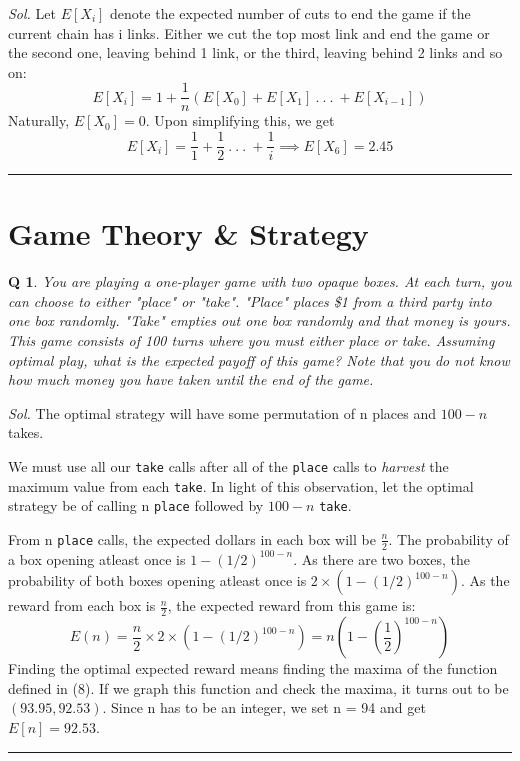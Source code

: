 \documentclass[DIV=15, fleqn, oneside, 8pt]{scrartcl}
\theoremstyle{clean}
\newtheorem{question}{Q} %
\newenvironment{solution}
{\par\textit{Sol.} }     %
{\par\medskip\hrule\bigskip}
\begin{document}
\begin{solution}
Let $E[X_i]$ denote the expected number of cuts to end the game if the current chain has i links.
Either we cut the top most link and end the game or the second one, leaving behind 1 link, or
the third, leaving behind 2 links and so on:
\[
E[X_i] = 1 + \frac{1}{n}(E[X_0] + E[X_1]\:.\:.\:.\:+E[X_{i - 1}])
\]
Naturally, $E[X_0] = 0$. Upon simplifying this, we get
\[
E[X_i] = \frac{1}{1} + \frac{1}{2} \:.\:.\:.\:+\frac{1}{i}
\implies E[X_6] = 2.45
\]
\end{solution}
\newpage
\section*{Game Theory \& Strategy}
\begin{question}
You are playing a one-player game with two opaque boxes. 
At each turn, you can choose to either "place" or "take". "Place" places \$1
from a third party into one box randomly. 
"Take" empties out one box randomly and that money is yours. This game consists of 
100 turns where you must either place or take. 
Assuming optimal play, what is the expected payoff of this game? 
Note that you do not know how much money you have taken until the end of the game.
\end{question}
\begin{solution}
The optimal strategy will have some permutation of n places and $100 - n$ takes.

We must use all our \texttt{take} calls after all of the \texttt{place} calls to \textit{harvest}
the maximum value from each \texttt{take}. 
In light of this observation, let the optimal strategy be of
calling n \texttt{place} followed by $100 - n$ \texttt{take}.

From n \texttt{place} calls, the expected dollars in each box will be $\frac{n}{2}$. The probability
of a box opening atleast once is $1 -  (1/2)^{100 - n}$. As there are two boxes, the probability
of both boxes opening atleast once is $2 \times (1 -  (1/2)^{100 - n})$. As the reward from each
box is $\frac{n}{2}$, the expected reward from this game is:
\begin{equation}
E(n) = \frac{n}{2} \times 2 \times (1 -  (1/2)^{100 - n}) = n (1 - (\frac{1}{2})^{100 - n})
\end{equation}
Finding the optimal expected reward means finding the maxima of the function defined in (8). If
we graph this function and check the maxima, it turns out to be $(93.95, 92.53)$. Since n has
to be an integer, we set n = 94 and get $E[n] = 92.53$.
\end{solution}
\end{document}
